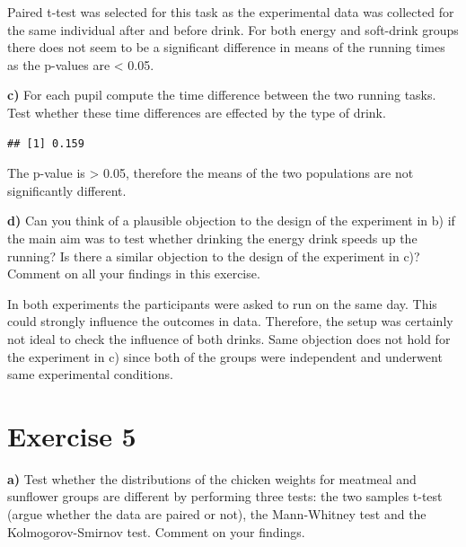 \documentclass[
]{article}
\newenvironment{Shaded}{\begin{snugshade}}{\end{snugshade}}
\newcommand{\CommentTok}[1]{\textcolor[rgb]{0.56,0.35,0.01}{\textit{#1}}}
\newcommand{\FunctionTok}[1]{\textcolor[rgb]{0.00,0.00,0.00}{#1}}
\newcommand{\NormalTok}[1]{#1}
\newcommand{\SpecialCharTok}[1]{\textcolor[rgb]{0.00,0.00,0.00}{#1}}
\begin{document}
Paired t-test was selected for this task as the experimental data was
collected for the same individual after and before drink. For both
energy and soft-drink groups there does not seem to be a significant
difference in means of the running times as the p-values are \textless{}
0.05.

\textbf{c)} For each pupil compute the time difference between the two
running tasks. Test whether these time differences are effected by the
type of drink.

\begin{Shaded}
\end{Shaded}

\begin{verbatim}
## [1] 0.159
\end{verbatim}

The p-value is \textgreater{} 0.05, therefore the means of the two
populations are not significantly different.

\textbf{d)} Can you think of a plausible objection to the design of the
experiment in b) if the main aim was to test whether drinking the energy
drink speeds up the running? Is there a similar objection to the design
of the experiment in c)? Comment on all your findings in this exercise.

In both experiments the participants were asked to run on the same day.
This could strongly influence the outcomes in data. Therefore, the setup
was certainly not ideal to check the influence of both drinks. Same
objection does not hold for the experiment in c) since both of the
groups were independent and underwent same experimental conditions.

\hypertarget{exercise-5}{%
\section{Exercise 5}\label{exercise-5}}

\textbf{a)} Test whether the distributions of the chicken weights for
meatmeal and sunflower groups are different by performing three tests:
the two samples t-test (argue whether the data are paired or not), the
Mann-Whitney test and the Kolmogorov-Smirnov test. Comment on your
findings.
\end{document}
